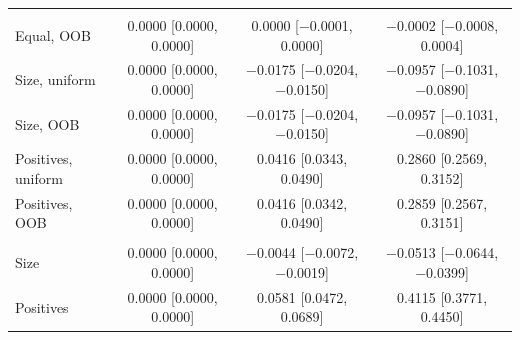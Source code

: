\begin{tabular}{lccc}
\addlinespace
\multicolumn{4}{@{}l}{\textit{Heart, Random Forest}} \\
Equal, OOB & 0.0000 [0.0000, 0.0000] & 0.0000 [$-$0.0001, 0.0000] & $-$0.0002 [$-$0.0008, 0.0004] \\
Size, uniform & 0.0000 [0.0000, 0.0000] & $-$0.0175 [$-$0.0204, $-$0.0150] & $-$0.0957 [$-$0.1031, $-$0.0890] \\
Size, OOB & 0.0000 [0.0000, 0.0000] & $-$0.0175 [$-$0.0204, $-$0.0150] & $-$0.0957 [$-$0.1031, $-$0.0890] \\
Positives, uniform & 0.0000 [0.0000, 0.0000] & 0.0416 [0.0343, 0.0490] & 0.2860 [0.2569, 0.3152] \\
Positives, OOB & 0.0000 [0.0000, 0.0000] & 0.0416 [0.0342, 0.0490] & 0.2859 [0.2567, 0.3151] \\
\addlinespace
\multicolumn{4}{@{}l}{\textit{Heart, XGBoost}} \\
Size & 0.0000 [0.0000, 0.0000] & $-$0.0044 [$-$0.0072, $-$0.0019] & $-$0.0513 [$-$0.0644, $-$0.0399] \\
Positives & 0.0000 [0.0000, 0.0000] & 0.0581 [0.0472, 0.0689] & 0.4115 [0.3771, 0.4450] \\
\bottomrule
\end{tabular}
